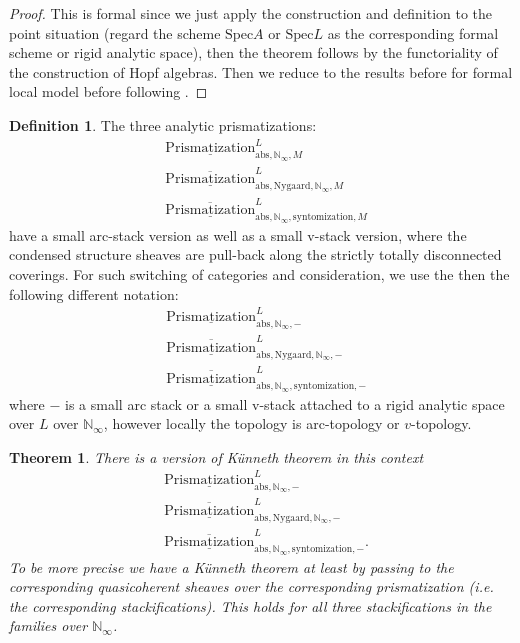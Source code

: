 \documentclass[12pt]{article}
\newtheorem{theorem}{Theorem}
\theoremstyle{definition}
\newtheorem{definition}{Definition}
\begin{document}
\begin{proof}
This is formal since we just apply the construction and definition to the point situation (regard the scheme $\mathrm{Spec}A$ or $\mathrm{Spec}L$ as the corresponding formal scheme or rigid analytic space), then the theorem follows by the functoriality of the construction of Hopf algebras. Then we reduce to the results before for formal local model before following \cite{3A}. 
\end{proof}


\begin{definition}
The three analytic prismatizations:
\begin{align}
&\underline{\mathrm{Prismatization}}^L_{\mathrm{abs},\mathbb{N}_\infty,M}\\
&\overline{\underline{\mathrm{Prismatization}}}^L_{\mathrm{abs},\mathrm{Nygaard},\mathbb{N}_\infty,M}\\
&\overline{\underline{\mathrm{Prismatization}}}^L_{\mathrm{abs},\mathbb{N}_\infty,\mathrm{syntomization},M}
\end{align}
have a small arc-stack version as well as a small v-stack version, where the condensed structure sheaves are pull-back along the strictly totally disconnected coverings. For such switching of categories and consideration, we use the then the following different notation:
\begin{align}
&\underline{\mathrm{Prismatization}}^L_{\mathrm{abs},\mathbb{N}_\infty,-}\\
&\overline{\underline{\mathrm{Prismatization}}}^L_{\mathrm{abs},\mathrm{Nygaard},\mathbb{N}_\infty,-}\\
&\overline{\underline{\mathrm{Prismatization}}}^L_{\mathrm{abs},\mathbb{N}_\infty,\mathrm{syntomization},-}
\end{align}
where $-$ is a small arc stack or a small v-stack attached to a rigid analytic space over $L$ over $\mathbb{N}_\infty$, however locally the topology is arc-topology or $v$-topology.
\end{definition}

\begin{theorem}
There is a version of K\"unneth theorem in this context
\begin{align}
&\underline{\mathrm{Prismatization}}^L_{\mathrm{abs},\mathbb{N}_\infty,-}\\
&\overline{\underline{\mathrm{Prismatization}}}^L_{\mathrm{abs},\mathrm{Nygaard},\mathbb{N}_\infty,-}\\
&\overline{\underline{\mathrm{Prismatization}}}^L_{\mathrm{abs},\mathbb{N}_\infty,\mathrm{syntomization},-}.
\end{align}
To be more precise we have a K\"unneth theorem at least by passing to the corresponding quasicoherent sheaves over the corresponding prismatization (i.e. the corresponding stackifications). This holds for all three stackifications in the families over $\mathbb{N}_\infty$. 
\end{theorem}
\end{document}
